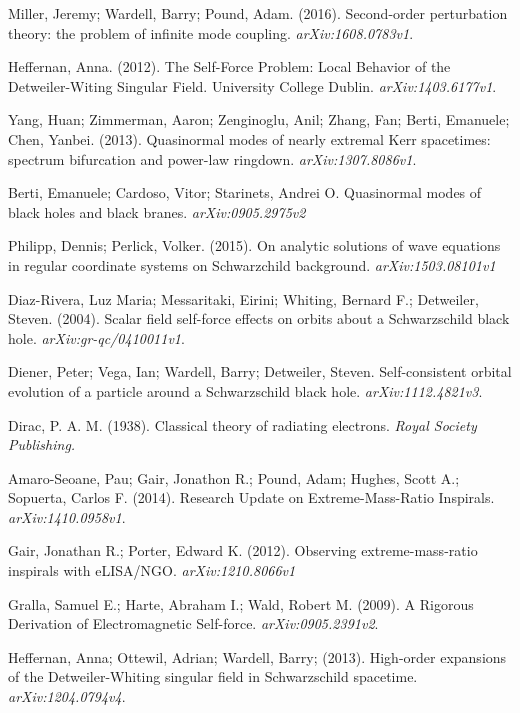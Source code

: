 Miller, Jeremy; Wardell, Barry; Pound, Adam. (2016). Second-order perturbation theory: the problem of infinite mode coupling. {\em arXiv:1608.0783v1}.

Heffernan, Anna. (2012). The Self-Force Problem: Local Behavior of the Detweiler-Witing Singular Field. University College Dublin. {\em arXiv:1403.6177v1}.

Yang, Huan; Zimmerman, Aaron; Zenginoglu, Anil; Zhang, Fan; Berti, Emanuele; Chen, Yanbei. (2013). Quasinormal modes of nearly extremal Kerr spacetimes: spectrum bifurcation and power-law ringdown. {\em arXiv:1307.8086v1}.

Berti, Emanuele; Cardoso, Vitor; Starinets, Andrei O. Quasinormal modes of black holes and black branes. {\em arXiv:0905.2975v2}

Philipp, Dennis; Perlick, Volker. (2015). On analytic solutions of wave equations in regular coordinate systems on Schwarzchild background. {\em arXiv:1503.08101v1} 

Diaz-Rivera, Luz Maria; Messaritaki, Eirini; Whiting, Bernard F.; Detweiler, Steven. (2004). Scalar field self-force effects on orbits about a Schwarzschild black hole. {\em arXiv:gr-qc/0410011v1}.

Diener, Peter; Vega, Ian; Wardell, Barry; Detweiler, Steven. Self-consistent orbital evolution of a particle around a Schwarzschild black hole. {\em arXiv:1112.4821v3}.

Dirac, P. A. M. (1938). Classical theory of radiating electrons. {\em Royal Society Publishing.}

Amaro-Seoane, Pau; Gair, Jonathon R.; Pound, Adam; Hughes, Scott A.; Sopuerta, Carlos F. (2014). Research Update on Extreme-Mass-Ratio Inspirals. {\em arXiv:1410.0958v1}.

Gair, Jonathan R.; Porter, Edward K. (2012). Observing extreme-mass-ratio inspirals with eLISA/NGO. {\em arXiv:1210.8066v1}

Gralla, Samuel E.; Harte, Abraham I.; Wald, Robert M. (2009). A Rigorous Derivation of Electromagnetic Self-force. {\em arXiv:0905.2391v2}.

Heffernan, Anna; Ottewil, Adrian; Wardell, Barry; (2013). High-order expansions of the Detweiler-Whiting singular field in Schwarzschild spacetime. {\em arXiv:1204.0794v4}.

